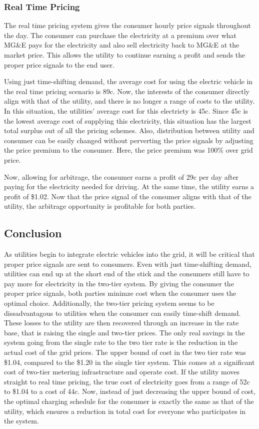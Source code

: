 \subsubsection{Real Time Pricing}
The real time pricing system gives the consumer hourly price signals throughout the day.  The consumer can purchase the electricity at a premium over what MG\&E pays for the electricity and also sell electricity back to MG\&E at the market price.  This allows the utility to continue earning a profit and sends the proper price signals to the end user.

Using just time-shifting demand, the average cost for using the electric vehicle in the real time pricing scenario is 89c.  Now, the interests of the consumer directly align with that of the utility, and there is no longer a range of costs to the utility.  In this situation, the utilities' average cost for this electricty is 45c.  Since 45c is the lowest average cost of supplying this electricity, this situation has the largest total surplus out of all the pricing schemes.  Also, distribution between utility and consumer can be easily changed without perverting the price signals by adjusting the price premium to the consumer.  Here, the price premium was 100\% over grid price.

Now, allowing for arbitrage, the consumer earns a profit of 29c per day after paying for the electricity needed for driving.  At the same time, the utility earns a profit of \$1.02.  Now that the price signal of the consumer aligns with that of the utility, the arbitrage opportunity is profitable for both parties.


\subsection{Conclusion}

As utilities begin to integrate electric vehicles into the grid, it will be critical that proper price signals are sent to consumers.  Even with just time-shifting demand, utilities can end up at the short end of the stick and the consumers still have to pay more for electricity in the two-tier system.  By giving the consumer the proper price signals, both parties minimze cost when the consumer uses the optimal choice.  Additionally, the two-tier pricing system seems to be dissadvantagous to utilities when the consumer can easily time-shift demand.  These losses to the utility are then recovered through an increase in the rate base, that is raising the single and two-tier prices.  The only real savings in the system going from the single rate to the two tier rate is the reduction in the actual cost of the grid prices.  The upper bound of cost in the two tier rate was \$1.04, compared to the \$1.20 in the single tier system.  This comes at a significant cost of two-tier metering infrastructure and operate cost.  If the utility moves straight to real time pricing, the true cost of electricity goes from a range of 52c to \$1.04 to a cost of 44c.  Now, instead of just decreasing the upper bound of cost, the optimal charging schedule for the consumer is exactly the same as that of the utility, which ensures a reduction in total cost for everyone who participates in the system.


